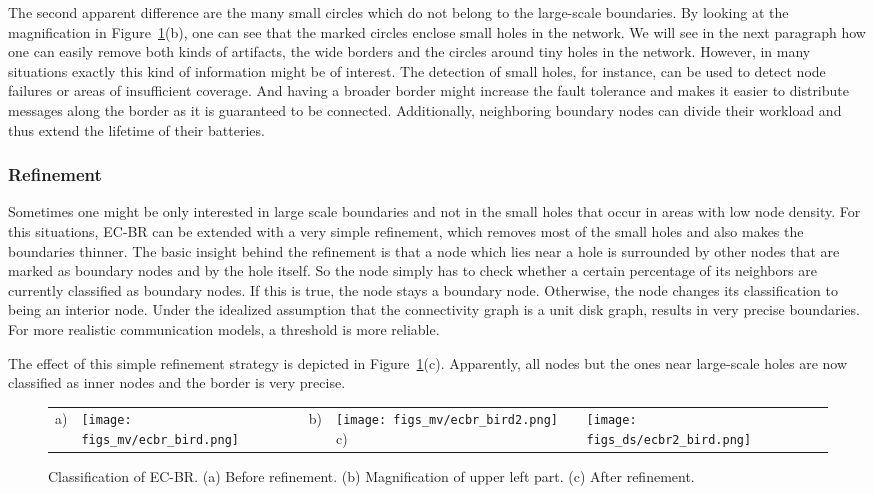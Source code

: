 \documentclass{llncs}
\begin{document}
The second apparent difference are the many small circles which do not belong to the large-scale boundaries.
By looking at the magnification in Figure~\ref{fig::ecbr_example}(b), one can see that the marked circles enclose small holes in the network.
We will see in the next paragraph how one can easily remove both kinds of artifacts, the wide borders and the circles around tiny holes in the network.
However, in many situations exactly this kind of information might be of interest.
The detection of small holes, for instance, can be used to detect node failures or areas of insufficient coverage.
And having a broader border might increase the fault tolerance and makes it easier to distribute messages along the border as it is guaranteed to be connected.
Additionally, neighboring boundary nodes can divide their workload and thus extend the lifetime of their batteries.

\subsubsection{Refinement}
Sometimes one might be only interested in large scale boundaries and not in the small holes that occur in areas with low node density.
For this situations, EC-BR can be extended with a very simple refinement, which removes most of the small holes and also makes the boundaries thinner.
The basic insight behind the refinement is that a node which lies near a hole is surrounded by other nodes that are marked as boundary nodes and by the hole itself.
So the node simply has to check whether a certain percentage  of its neighbors are currently classified as boundary nodes.
If this is true, the node stays a boundary node.
Otherwise, the node changes its classification to being an interior node.
Under the idealized assumption that the connectivity graph is a unit disk graph,  results in very precise boundaries.
For more realistic communication models, a threshold  is more reliable.

The effect of this simple refinement strategy is depicted in Figure~\ref{fig::ecbr_example}(c).
Apparently, all nodes but the ones near large-scale holes are now classified as inner nodes and the border is very precise.
\begin{figure}[t]
\centering
\begin{tabular}{llllll}
 a) \hspace{0.1cm} &
\parbox[c]{.2\columnwidth}{\texttt{[image: figs\_mv/ecbr\_bird.png]}} &
\hspace{0.5cm}  b) \hspace{0.1cm} &
\parbox[c]{.2\columnwidth}{\texttt{[image: figs\_mv/ecbr\_bird2.png]}}
\hspace{0.5cm}  c) \hspace{0.1cm} &
\parbox[c]{.2\columnwidth}{\texttt{[image: figs\_ds/ecbr2\_bird.png]}}
\end{tabular}
\caption{Classification of EC-BR. (a) Before refinement. (b) Magnification of upper left part. (c) After refinement.}
\label{fig::ecbr_example}
\end{figure}
\end{document}
